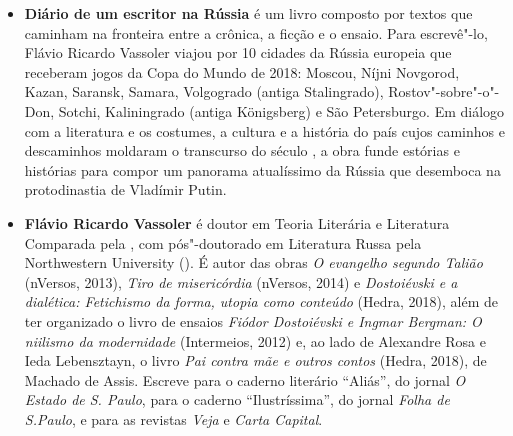 \begin{itemize}


\item \textbf{Diário de um escritor na Rússia} é um livro composto por textos que caminham na
fronteira entre a crônica, a ficção e o ensaio. Para escrevê"-lo, Flávio Ricardo Vassoler
viajou por 10 cidades da Rússia europeia que receberam jogos da Copa do Mundo de
2018: Moscou, Níjni Novgorod, Kazan, Saransk, Samara, Volgogrado (antiga
Stalingrado), Rostov"-sobre"-o"-Don, Sotchi, Kaliningrado (antiga Königsberg) e São
Petersburgo. Em diálogo com a literatura e os costumes, a cultura e a história do país
cujos caminhos e descaminhos moldaram o transcurso do século , a obra funde
estórias e histórias para compor um panorama atualíssimo da Rússia que desemboca na
protodinastia de Vladímir Putin.
  
\item \textbf{Flávio Ricardo Vassoler} é doutor em Teoria Literária e Literatura Comparada pela , com pós"-doutorado em Literatura Russa pela Northwestern University (). É autor das obras \emph{O evangelho segundo Talião} (nVersos, 2013), \emph{Tiro de misericórdia} (nVersos, 2014) e \emph{Dostoiévski e a dialética: Fetichismo da forma, utopia como conteúdo} (Hedra, 2018), além de ter organizado o livro de ensaios \emph{Fiódor Dostoiévski e Ingmar Bergman: O niilismo da modernidade} (Intermeios, 2012) e, ao lado de Alexandre Rosa e Ieda Lebensztayn, o livro \emph{Pai contra mãe e outros contos} (Hedra, 2018), de Machado de Assis. Escreve para o caderno literário ``Aliás'', do jornal \emph{O Estado de S. Paulo}, para o caderno ``Ilustríssima'', do jornal \emph{Folha de S.Paulo}, e para as revistas \emph{Veja} e \emph{Carta Capital}. 

\end{itemize}

